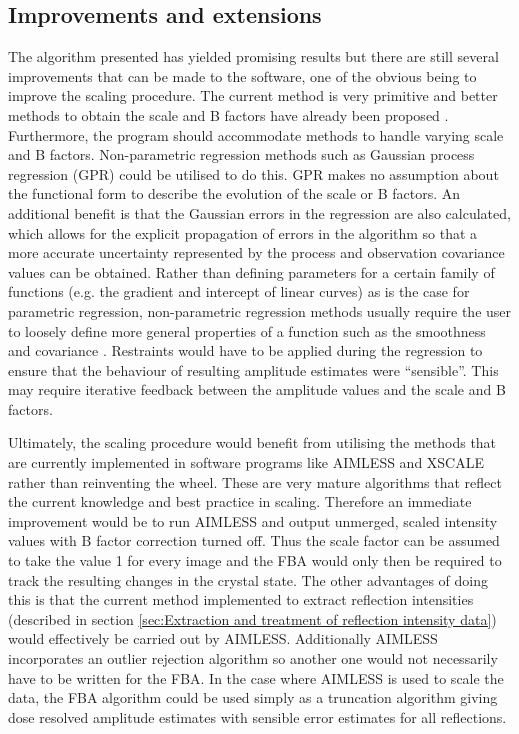 \subsection{Improvements and extensions}
\label{sub:Improvements and Extensions}
The algorithm presented has yielded promising results but there are still several improvements that can be made to the software, one of the obvious being to improve the scaling procedure.
The current method is very primitive and better methods to obtain the scale and B factors have already been proposed \cite{popov2003}.
Furthermore, the program should accommodate methods to handle varying scale and B factors.
Non-parametric regression methods such as Gaussian process regression (GPR) could be utilised to do this.
GPR makes no assumption about the functional form to describe the evolution of the scale or B factors.
An additional benefit is that the Gaussian errors in the regression are also calculated, which allows for the explicit propagation of errors in the algorithm so that a more accurate uncertainty represented by the process and observation covariance values can be obtained.
Rather than defining parameters for a certain family of functions (e.g. the gradient and intercept of linear curves) as is the case for parametric regression, non-parametric regression methods usually require the user to loosely define more general properties of a function such as the smoothness and covariance \cite{rasmussen2006gaussian}.
Restraints would have to be applied during the regression to ensure that the behaviour of resulting amplitude estimates were ``sensible''.
This may require iterative feedback between the amplitude values and the scale and B factors.

Ultimately, the scaling procedure would benefit from utilising the methods that are currently implemented in software programs like AIMLESS and XSCALE rather than reinventing the wheel.
These are very mature algorithms that reflect the current knowledge and best practice in scaling.
Therefore an immediate improvement would be to run AIMLESS and output unmerged, scaled intensity values with B factor correction turned off.
Thus the scale factor can be assumed to take the value 1 for every image and the FBA would only then be required to track the resulting changes in the crystal state.
The other advantages of doing this is that the current method implemented to extract reflection intensities (described in section \ref{sec:Extraction and treatment of reflection intensity data}) would effectively be carried out by AIMLESS.
Additionally AIMLESS incorporates an outlier rejection algorithm so another one would not necessarily have to be written for the FBA.
In the case where AIMLESS is used to scale the data, the FBA algorithm could be used simply as a truncation algorithm giving dose resolved amplitude estimates with sensible error estimates for all reflections.

